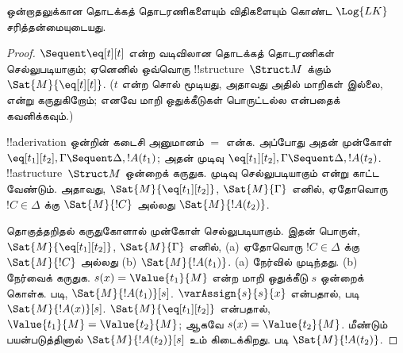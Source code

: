 \documentclass[../../../include/open-logic-section]{subfiles}
\begin{document}


\begin{prop}
ஒன்றாதலுக்கான தொடக்கத் தொடரணிகளையும் விதிகளையும் கொண்ட $\Log{LK}$
சரித்தன்மையுடையது.
\end{prop}

\begin{proof}
${} \Sequent \eq[t][t]$ என்ற வடிவிலான தொடக்கத் தொடரணிகள் செல்லுபடியாகும்;
ஏனெனில் ஒவ்வொரு !!{structure}~$\Struct M$ க்கும்
$\Sat{M}{\eq[t][t]}$. ($t$ என்ற சொல் மூடியது, அதாவது அதில் மாறிகள் இல்லை,
என்று கருதுகிறோம்; எனவே மாறி ஒதுக்கீடுகள் பொருட்டல்ல என்பதைக் கவனிக்கவும்.)

!!a{derivation} ஒன்றின் கடைசி அனுமானம் $=$ என்க. அப்போது அதன் முன்கோள்
$\eq[t_1][t_2], \Gamma \Sequent \Delta, !A(t_1)$; அதன் முடிவு
$\eq[t_1][t_2], \Gamma \Sequent \Delta, !A(t_2)$. !!a{structure}~$\Struct M$
ஒன்றைக் கருதுக. முடிவு செல்லுபடியாகும் என்று காட்ட வேண்டும். அதாவது,
$\Sat{M}{\eq[t_1][t_2]}$, $\Sat{M}{\Gamma}$ எனில், ஏதோவொரு $!C \in
\Delta$ க்கு $\Sat{M}{!C}$ அல்லது $\Sat{M}{!A(t_2)}$.

தொகுத்தறிதல் கருதுகோளால் முன்கோள் செல்லுபடியாகும். இதன் பொருள்,
$\Sat{M}{\eq[t_1][t_2]}$, $\Sat{M}{\Gamma}$ எனில், (a) ஏதோவொரு $!C \in
\Delta$ க்கு $\Sat{M}{!C}$ அல்லது (b) $\Sat{M}{!A(t_1)}$. (a) நேர்வில்
முடிந்தது. (b) நேர்வைக் கருதுக. $s(x) = \Value{t_1}{M}$ என்ற மாறி ஒதுக்கீடு
$s$ ஒன்றைக் கொள்க.
 படி,
$\Sat{M}{!A(t_1)}[s]$. $\varAssign{s}{s}{x}$ என்பதால்,
 படி
$\Sat{M}{!A(x)}[s]$.
$\Sat{M}{\eq[t_1][t_2]}$ என்பதால், $\Value{t_1}{M} = \Value{t_2}{M}$;
ஆகவே $s(x) = \Value{t_2}{M}$.
 மீண்டும்
பயன்படுத்தினால் $\Sat{M}{!A(t_2)}[s]$ உம் கிடைக்கிறது.
 படி
$\Sat{M}{!A(t_2)}$.
\end{proof}
\end{document}
